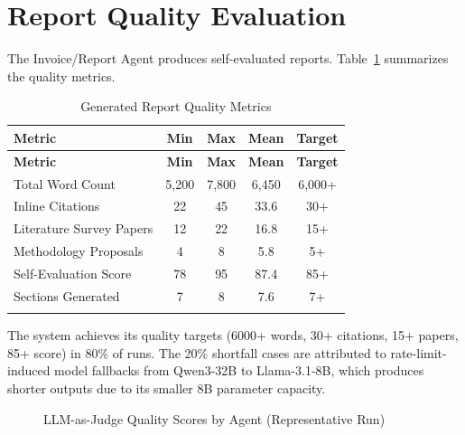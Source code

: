 \documentclass[a4paper,12pt,openany]{report}
\begin{document}
\section{Report Quality Evaluation}

The Invoice/Report Agent produces self-evaluated reports. Table~\ref{tab:report_quality} summarizes the quality metrics.

\begin{longtable}{|p{4cm}|c|c|c|c|}
\hline
\textbf{Metric} & \textbf{Min} & \textbf{Max} & \textbf{Mean} & \textbf{Target} \\
\hline
\endfirsthead
\hline
\textbf{Metric} & \textbf{Min} & \textbf{Max} & \textbf{Mean} & \textbf{Target} \\
\hline
\endhead
\hline
\endfoot
Total Word Count & 5,200 & 7,800 & 6,450 & 6,000+ \\
\hline
Inline Citations & 22 & 45 & 33.6 & 30+ \\
\hline
Literature Survey Papers & 12 & 22 & 16.8 & 15+ \\
\hline
Methodology Proposals & 4 & 8 & 5.8 & 5+ \\
\hline
Self-Evaluation Score & 78 & 95 & 87.4 & 85+ \\
\hline
Sections Generated & 7 & 8 & 7.6 & 7+ \\
\hline

\caption{Generated Report Quality Metrics}
\label{tab:report_quality}
\end{longtable}

The system achieves its quality targets (6000+ words, 30+ citations, 15+ papers, 85+ score) in 80\% of runs. The 20\% shortfall cases are attributed to rate-limit-induced model fallbacks from Qwen3-32B to Llama-3.1-8B, which produces shorter outputs due to its smaller 8B parameter capacity.

\begin{figure}[H]
\centering
{}
\caption{LLM-as-Judge Quality Scores by Agent (Representative Run)}
\label{fig:quality_scores}
\end{figure}
\end{document}
